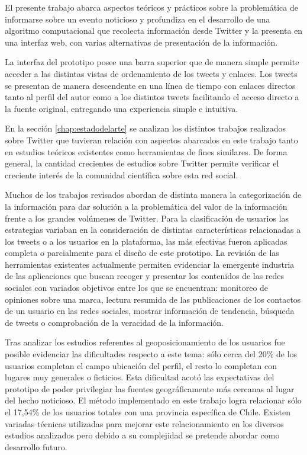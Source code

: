 El presente trabajo abarca aspectos teóricos y prácticos sobre la problemática
de informarse sobre un evento noticioso y profundiza en el desarrollo de una algoritmo computacional que recolecta información desde Twitter y la presenta en una interfaz web, con varias alternativas de presentación de la información.

La interfaz del prototipo posee una barra superior que de manera simple permite acceder a las distintas vistas de ordenamiento de los tweets y enlaces. Los tweets se presentan de manera descendente en una línea de tiempo con enlaces directos tanto al perfil del autor como a los distintos tweets facilitando el acceso directo a la fuente original, entregando una experiencia simple e intuitiva.

En la sección \ref{chap:estadodelarte} se analizan los distintos trabajos realizados sobre Twitter que tuvieran relación con aspectos abarcados en este trabajo tanto en estudios teóricos existentes como herramientas de fines similares. De forma general, la cantidad crecientes de estudios sobre Twitter permite verificar el creciente interés de la comunidad científica sobre esta red social.

Muchos de los trabajos revisados abordan de distinta manera la categorización de la información para dar solución a la problemática del valor de la información frente a los grandes volúmenes de Twitter. Para la clasificación de usuarios las estrategias variaban en la consideración de distintas características relacionadas a los tweets o a los usuarios en la plataforma, las más efectivas fueron aplicadas completa o parcialmente para el diseño de este prototipo. La revisión de las herramientas existentes actualmente permiten evidenciar la emergente industria de las aplicaciones que buscan recoger y presentar los contenidos de las redes sociales con variados objetivos entre los que se encuentran: monitoreo de opiniones sobre una marca, lectura resumida de las publicaciones de los contactos de un usuario en las redes sociales, mostrar información de tendencia, búsqueda de tweets o comprobación de la veracidad de la información.

Tras analizar los estudios referentes al geoposicionamiento de los usuarios fue posible evidenciar las dificultades respecto a este tema: sólo cerca del 20\% de los usuarios completan el campo ubicación del perfil, el resto lo completan con lugares muy generales o ficticios. Esta dificultad acotó las expectativas del prototipo de poder privilegiar las fuentes geográficamente más cercanas al lugar del hecho noticioso. El método implementado en este trabajo logra relacionar sólo el 17,54\% de los usuarios totales con una provincia específica de Chile. Existen variadas técnicas utilizadas para mejorar este relacionamiento en los diversos estudios analizados  \cite{Cheng:2010:YYT:1871437.1871535} \cite{McGee:2011:GST:2063576.2063959} pero debido a su complejidad se pretende abordar como desarrollo futuro.

